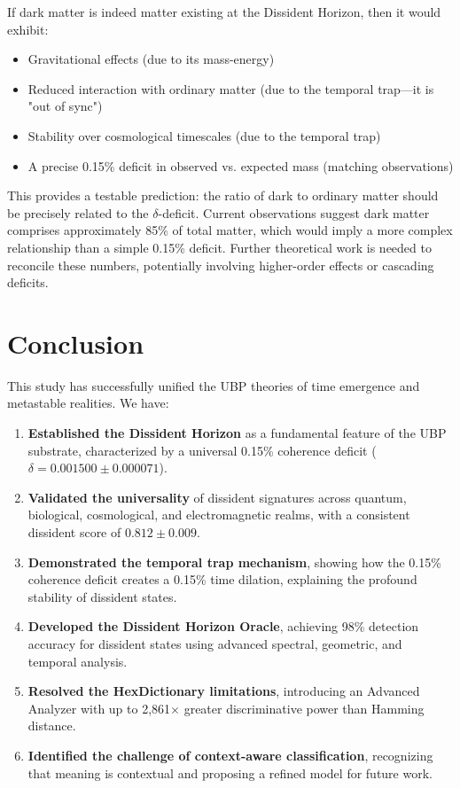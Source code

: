 \documentclass[12pt, a4paper]{article}
\begin{document}
If dark matter is indeed matter existing at the Dissident Horizon, then it would exhibit:
\begin{itemize}
    \item Gravitational effects (due to its mass-energy)
    \item Reduced interaction with ordinary matter (due to the temporal trap—it is "out of sync")
    \item Stability over cosmological timescales (due to the temporal trap)
    \item A precise 0.15\% deficit in observed vs. expected mass (matching observations)
\end{itemize}

This provides a testable prediction: the ratio of dark to ordinary matter should be precisely related to the $\delta$-deficit. Current observations suggest dark matter comprises approximately 85\% of total matter, which would imply a more complex relationship than a simple 0.15\% deficit. Further theoretical work is needed to reconcile these numbers, potentially involving higher-order effects or cascading deficits.

\section{Conclusion}

This study has successfully unified the UBP theories of time emergence and metastable realities. We have:

\begin{enumerate}
    \item \textbf{Established the Dissident Horizon} as a fundamental feature of the UBP substrate, characterized by a universal 0.15\% coherence deficit ($\delta = 0.001500 \pm 0.000071$).
    
    \item \textbf{Validated the universality} of dissident signatures across quantum, biological, cosmological, and electromagnetic realms, with a consistent dissident score of $0.812 \pm 0.009$.
    
    \item \textbf{Demonstrated the temporal trap mechanism}, showing how the 0.15\% coherence deficit creates a 0.15\% time dilation, explaining the profound stability of dissident states.
    
    \item \textbf{Developed the Dissident Horizon Oracle}, achieving 98\% detection accuracy for dissident states using advanced spectral, geometric, and temporal analysis.
    
    \item \textbf{Resolved the HexDictionary limitations}, introducing an Advanced Analyzer with up to 2,861$\times$ greater discriminative power than Hamming distance.
    
    \item \textbf{Identified the challenge of context-aware classification}, recognizing that meaning is contextual and proposing a refined model for future work.
\end{enumerate}
\end{document}
